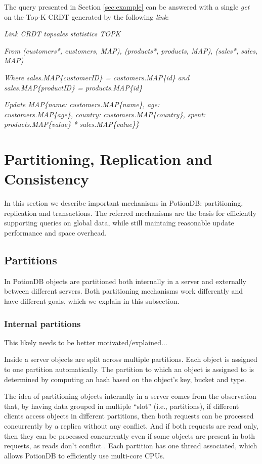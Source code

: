 \documentclass{vldb}
\newcommand{\grumbler}[2]{{\color{red}{\bf #1:} #2}}
\newcommand{\andre}[1]{\grumbler{andre}{#1}}
\newcommand{\emphvspace}{0.5\baselineskip}
\newcommand{\firstblockemph}[1]{\vspace{\emphvspace}\hspace{2em}\emph{#1}}
\newcommand{\middleblockemph}[1]{\hspace{2em}\emph{#1}}
\newcommand{\lastblockemph}[1]{\hspace{2em}\emph{#1}\vspace{\emphvspace}}
\begin{document}
The query presented in Section \ref{sec:example} can be answered with a single \emph{get} on the Top-K CRDT generated by the following \emph{link}:

\firstblockemph{Link CRDT topsales statistics TOPK}

\middleblockemph{From (customers*, customers, MAP), (products*, products, MAP), (sales*, sales, MAP)}

\middleblockemph{Where sales.MAP\{customerID\} = customers.MAP\{id\} \emph{and}  sales.MAP\{productID\} = products.MAP\{id\}}

\lastblockemph{Update MAP\{name: customers.MAP\{name\}, age: \\ customers.MAP\{age\}, country: customers.MAP\{country\}, spent: products.MAP\{value\} * sales.MAP\{value\}\}}

\section{Partitioning, Replication and Consistency}

In this section we describe important mechanisms in PotionDB: partitioning, replication and transactions.
The referred mechanisms are the basis for efficiently supporting queries on global data, while still maintaing reasonable update performance and space overhead.

\subsection{Partitions}

In PotionDB objects are partitioned both internally in a server and externally between different servers.
Both partitioning mechanisms work differently and have different goals, which we explain in this subsection.

\subsubsection{Internal partitions}

\andre{This likely needs to be better motivated/explained...}

Inside a server objects are split across multiple partitions.
Each object is assigned to one partition automatically.
The partition to which an object is assigned to is determined by computing an hash based on the object's key, bucket and type.

The idea of partitioning objects internally in a server comes from the observation that, by having data grouped in multiple ``slot'' (i.e., partitions), if different clients access objects in different partitions, then both requests can be processed concurrently by a replica without any conflict.
And if both requests are read only, then they can be processed concurrently even if some objects are present in both requests, as reads don't conflict \cite{???}.
Each partition has one thread associated, which allows PotionDB to efficiently use multi-core CPUs.
\end{document}
